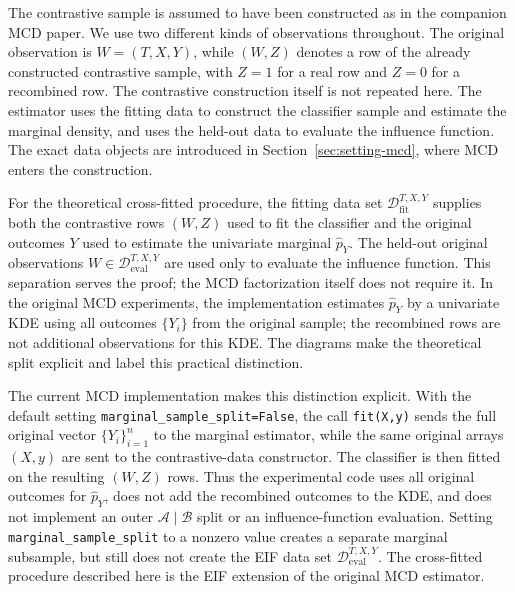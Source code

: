 \documentclass[11pt]{article}
\theoremstyle{plain}
\theoremstyle{definition}
\theoremstyle{remark}
\newcommand{\Dfit}{\ensuremath{\mathcal{D}_{\mathrm{fit}}^{T,X,Y}}}
\newcommand{\Deval}{\ensuremath{\mathcal{D}_{\mathrm{eval}}^{T,X,Y}}}
\begin{document}
The contrastive sample is assumed to have been constructed as in the companion MCD paper.
We use two different kinds of observations throughout. The original observation is
$W=(T,X,Y)$, while $(W,Z)$ denotes a row of the already constructed contrastive sample,
with $Z=1$ for a real row and $Z=0$ for a recombined row. The contrastive construction itself
is not repeated here. The estimator uses the fitting data to construct the classifier sample
and estimate the marginal density, and uses the held-out data to evaluate the influence
function. The exact data objects are introduced in Section~\ref{sec:setting-mcd}, where MCD
enters the construction.

For the theoretical cross-fitted procedure, the fitting data set $\Dfit$ supplies both the
contrastive rows $(W,Z)$ used to fit the classifier and the original outcomes $Y$ used to
estimate the univariate marginal $\widehat p_Y$. The held-out original observations
$W\in\Deval$ are used only to evaluate the influence function. This separation serves the
proof; the MCD factorization itself does not require it. In the original MCD
experiments, the implementation estimates $\widehat p_Y$ by a univariate KDE using all
outcomes $\{Y_i\}$ from the original sample; the recombined rows are not additional
observations for this KDE. The diagrams make the theoretical split explicit and label this
practical distinction.

The current MCD implementation makes this distinction explicit. With the default setting
\texttt{marginal\_sample\_split=False}, the call \texttt{fit(X,y)} sends the full original vector
$\{Y_i\}_{i=1}^n$ to the marginal estimator, while the same original arrays $(X,y)$ are sent
to the contrastive-data constructor. The classifier is then fitted on the resulting $(W,Z)$
rows. Thus the experimental code uses all original outcomes for $\widehat p_Y$, does not add
the recombined outcomes to the KDE, and does not implement an outer $\mathcal A\mid\mathcal B$
split or an influence-function evaluation. Setting \texttt{marginal\_sample\_split} to a nonzero value
creates a separate marginal subsample, but still does not create the EIF data set $\Deval$.
The cross-fitted procedure described here is the EIF extension of the original MCD estimator.
\end{document}
